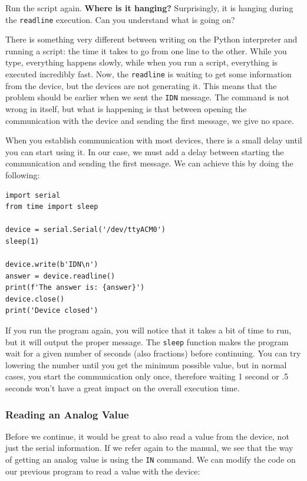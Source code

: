 Run the script again. \textbf{Where is it hanging?} Surprisingly, it is hanging during the \texttt{readline} execution. Can you understand what is going on?

There is something very different between writing on the Python interpreter and running a script: the time it takes to go from one line to the other. While you type, everything happens slowly, while when you run a script, everything is executed incredibly fast. Now, the \texttt{readline} is waiting to get some information from the device, but the devices are not generating it. This means that the problem should be earlier when we sent the \texttt{IDN} message. The command is not wrong in itself, but what is happening is that between opening the communication with the device and sending the first message, we give no space.

When you establish communication with most devices, there is a small delay until you can start using it. In our case, we must add a delay between starting the communication and sending the first message. We can achieve this by doing the following:

\begin{verbatim}
import serial
from time import sleep

device = serial.Serial('/dev/ttyACM0')
sleep(1)

device.write(b'IDN\n')
answer = device.readline()
print(f'The answer is: {answer}')
device.close()
print('Device closed')
\end{verbatim}

If you run the program again, you will notice that it takes a bit of time to run, but it will output the proper message. The \texttt{sleep} function makes the program wait for a given number of seconds (also fractions) before continuing. You can try lowering the number until you get the minimum possible value, but in normal cases, you start the communication only once, therefore waiting 1 second or .5 seconds won't have a great impact on the overall execution time.

\subsubsection{Reading an Analog Value}
Before we continue, it would be great to also read a value from the device, not just the serial information. If we refer again to the manual, we see that the way of getting an analog value is using the \texttt{IN} command. We can modify the code on our previous program to read a value with the device:

